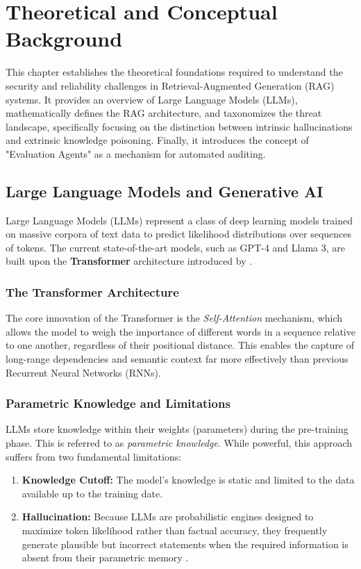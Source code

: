 \chapter{Theoretical and Conceptual Background}
\label{ch2_theory_background}

This chapter establishes the theoretical foundations required to understand the security and reliability challenges in Retrieval-Augmented Generation (RAG) systems. It provides an overview of Large Language Models (LLMs), mathematically defines the RAG architecture, and taxonomizes the threat landscape, specifically focusing on the distinction between intrinsic hallucinations and extrinsic knowledge poisoning. Finally, it introduces the concept of "Evaluation Agents" as a mechanism for automated auditing.

\section{Large Language Models and Generative AI}
\label{sec:llm_overview}

Large Language Models (LLMs) represent a class of deep learning models trained on massive corpora of text data to predict likelihood distributions over sequences of tokens. The current state-of-the-art models, such as GPT-4 and Llama 3, are built upon the \textbf{Transformer} architecture introduced by \textcite{vaswani2017attention}.

\subsection{The Transformer Architecture}
The core innovation of the Transformer is the \textit{Self-Attention} mechanism, which allows the model to weigh the importance of different words in a sequence relative to one another, regardless of their positional distance. This enables the capture of long-range dependencies and semantic context far more effectively than previous Recurrent Neural Networks (RNNs).

\subsection{Parametric Knowledge and Limitations}
LLMs store knowledge within their weights (parameters) during the pre-training phase. This is referred to as \textit{parametric knowledge}. While powerful, this approach suffers from two fundamental limitations:
\begin{enumerate}
    \item \textbf{Knowledge Cutoff:} The model's knowledge is static and limited to the data available up to the training date.
    \item \textbf{Hallucination:} Because LLMs are probabilistic engines designed to maximize token likelihood rather than factual accuracy, they frequently generate plausible but incorrect statements when the required information is absent from their parametric memory \parencite{ji2023survey}.
\end{enumerate}

